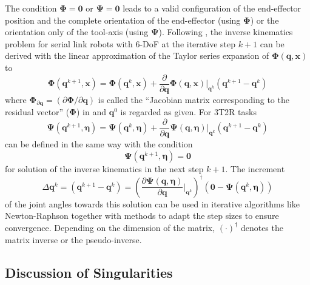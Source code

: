 \documentclass{svproc}
\newcommand{\bm}[1]{\boldsymbol{#1}}
\begin{document}
The condition $\bm{\Phi}=\bm{0}$ or $\bm{\Psi}=\bm{0}$ leads to a valid configuration of the end-effector position and the complete orientation of the end-effector (using $\bm{\Phi}$) or the orientation only of the tool-axis (using $\bm{\Psi}$).
Following \cite{GoldenbergBenFen1985}, the inverse kinematics problem for serial link robots with 6-DoF at the iterative step $k+1$ can be derived with the linear approximation of the Taylor series expansion of $\bm{\Phi}(\bm{q},\bm{x})$ to
%
\begin{equation}
\bm{\Phi}(\bm{q}^{k+1},\bm{x}) = 
\bm{\Phi}(\bm{q}^{k},\bm{x})
+
\frac{\partial}{\partial \bm{q}} \bm{\Phi}(\bm{q},\bm{x}) \biggr\rvert_{\bm{q}^k} (\bm{q}^{k+1} - \bm{q}^k)
\label{equ:taylor_phi}
\end{equation}
%
where $\bm{\Phi}_{\partial\bm{q}}=(\partial \bm{\Phi} / \partial \bm{q})$ is called the ``Jacobian matrix corresponding to the residual vector'' ($\bm{\Phi}$) in \cite{GoldenbergBenFen1985} and $\bm{q}^0$ is regarded as given.
%
For 3T2R tasks
%
\begin{equation}
\bm{\Psi}(\bm{q}^{k+1},\bm{\eta}) = 
\bm{\Psi}(\bm{q}^{k},\bm{\eta})
+
\frac{\partial}{\partial \bm{q}} \bm{\Psi}(\bm{q},\bm{\eta}) \biggr\rvert_{\bm{q}^k} (\bm{q}^{k+1} - \bm{q}^k)
\label{equ:taylor_psi}
\end{equation}
%
can be defined in the same way with the condition
%
\begin{equation}
\bm{\Psi}(\bm{q}^{k+1},\bm{\eta})=\bm{0}
\end{equation}
%
for solution of the inverse kinematics in the next step $k+1$. The increment 
%
\begin{equation}
\Delta \bm{q}^k
=
(\bm{q}^{k+1} - \bm{q}^k)
=
\left(\frac{\partial \bm{\Psi}(\bm{q},\bm{\eta})}{\partial \bm{q}}\biggr\rvert_{\bm{q}^k}\right)^{\dagger}
(\bm{0} - \bm{\Psi}(\bm{q}^{k},\bm{\eta}))
\label{equ:deltaq_psi}
\end{equation}
%
of the joint angles towards this solution can be used in iterative algorithms like Newton-Raphson together with methods to adapt the step sizes to ensure convergence.
Depending on the dimension of the matrix, $(\cdot)^\dagger$ denotes the matrix inverse or the pseudo-inverse.

\subsection{Discussion of Singularities}
\end{document}
